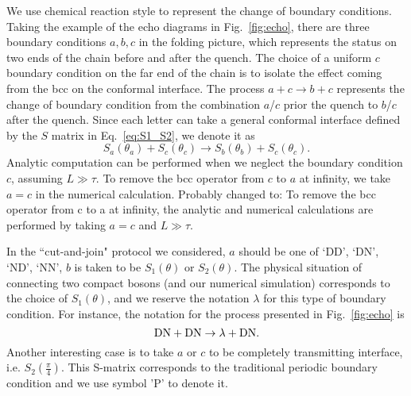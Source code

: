 
We use chemical reaction style to represent the change of boundary conditions. Taking the example of the echo diagrams in Fig.~\ref{fig:echo}, there are three boundary conditions $a,b,c$ in the folding picture, which represents the status on two ends of the chain before and after the quench. The choice of a uniform $c$ boundary condition on the far end of the chain is to isolate the effect coming from the bcc on the conformal interface. The process $a + c \rightarrow b + c$ represents the change of boundary condition from the combination $a$/$c$ prior the quench to $b$/$c$ after the quench. Since each letter can take a general conformal interface defined by the $S$ matrix in Eq.~\eqref{eq:S1_S2}, we denote it as
\begin{equation}
S_a( \theta_a ) + S_c( \theta_c) \rightarrow S_b( \theta_b )  + S_c( \theta_c ) .
\end{equation}
{\color{red} Analytic computation can be performed when we neglect the boundary condition $c$, assuming $L \gg \tau$. To remove the bcc operator from $c$ to $a$ at infinity, we take $a = c$ in the numerical calculation. Probably changed to: To remove the bcc operator from c to a at infinity, the analytic and numerical calculations are performed by taking $a=c$ and $L\gg\tau$.}

In the ``cut-and-join" protocol we considered, $a$ should be one of `DD', `DN', `ND', `NN', $b$ is taken to be $S_1( \theta )$ or $S_2( \theta )$. The physical situation of connecting two compact bosons (and our numerical simulation) corresponds to the choice of $S_1( \theta)$, and we reserve the notation $\lambda$ for this type of boundary condition. For instance, the notation for the process presented in Fig.~\ref{fig:echo} is
\begin{equation}
\label{eq:DNDN}
{\rm DN }  + {\rm DN} \rightarrow \lambda + { \rm DN} .
\end{equation}
Another interesting case is to take $a$ or $c$ to be completely transmitting interface, i.e. $S_2( \frac{\pi}{4} )$. This S-matrix corresponds to the traditional periodic boundary condition and we use symbol 'P' to denote it. 


